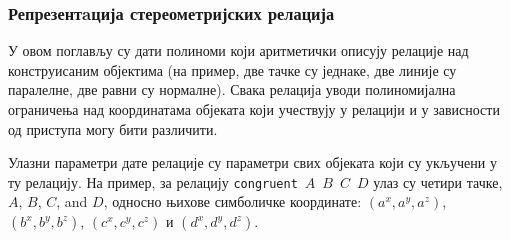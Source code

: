 \subsubsection{Репрезентaција стереометријских релација}

У овом поглављу су дати полиноми који аритметички описују релације над
конструисаним објектима (на пример, две тачке су једнаке, две линије
су паралелне, две равни су нормалне). Свака релација уводи
полиномијална ограничења над координатама објеката који учествују у
релацији и у зависности од приступа могу бити различити.

Улазни параметри дате релације су параметри свих објеката који су
укључени у ту релацију. На пример, за релацију \mbox{{\tt congruent}
  $A$ $B$ $C$ $D$} улаз су четири тачке, $A$, $B$, $C$, and $D$,
односно њихове симболичке координате: $(a^x, a^y, a^z)$, $(b^x, b^y,
b^z)$, $(c^x, c^y, c^z)$ и $(d^x, d^y, d^z)$.

